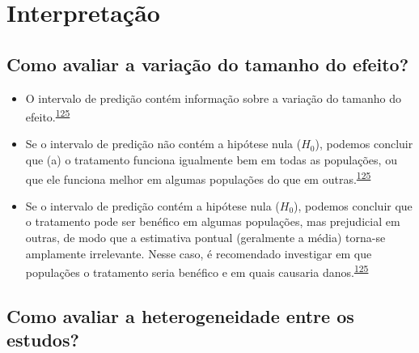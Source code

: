 \documentclass[
]{book}
\begin{document}
\hypertarget{interpretacao}{%
\section{Interpretação}\label{interpretacao}}

\hypertarget{como-avaliar-a-variauxe7uxe3o-do-tamanho-do-efeito}{%
\subsection{Como avaliar a variação do tamanho do efeito?}\label{como-avaliar-a-variauxe7uxe3o-do-tamanho-do-efeito}}

\begin{itemize}
\item
  O intervalo de predição contém informação sobre a variação do tamanho do efeito.\textsuperscript{\protect\hyperlink{ref-Borenstein2022}{125}}
\item
  Se o intervalo de predição não contém a hipótese nula (\(H_{0}\)), podemos concluir que (a) o tratamento funciona igualmente bem em todas as populações, ou que ele funciona melhor em algumas populações do que em outras.\textsuperscript{\protect\hyperlink{ref-Borenstein2022}{125}}
\item
  Se o intervalo de predição contém a hipótese nula (\(H_{0}\)), podemos concluir que o tratamento pode ser benéfico em algumas populações, mas prejudicial em outras, de modo que a estimativa pontual (geralmente a média) torna-se amplamente irrelevante. Nesse caso, é recomendado investigar em que populações o tratamento seria benéfico e em quais causaria danos.\textsuperscript{\protect\hyperlink{ref-Borenstein2022}{125}}
\end{itemize}

\hypertarget{como-avaliar-a-heterogeneidade-entre-os-estudos}{%
\subsection{Como avaliar a heterogeneidade entre os estudos?}\label{como-avaliar-a-heterogeneidade-entre-os-estudos}}
\end{document}
